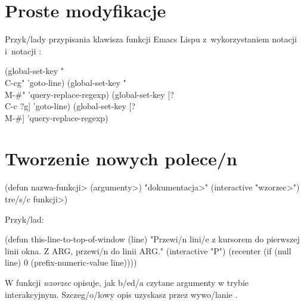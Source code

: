 \section{Proste modyfikacje}



Przyk/lady przypisania klawisza funkcji Emacs Lispu\newline
z~wykorzystaniem notacji  i~notacji \kbd{[...]}:

\beginexample%
(global-set-key "\\C-cg" 'goto-line)
(global-set-key "\\M-\#" 'query-replace-regexp)
\smallskip
(global-set-key [?\\C-c ?g] 'goto-line)
(global-set-key [?\\M-\#] 'query-replace-regexp)
\endexample

\section{Tworzenie nowych polece/n}

\beginexample%
(defun \<nazwa-funkcji> (\<argumenty>)
  "\<dokumentacja>" 
  (interactive "\<wzorzec>")
  \<tre/s/c funkcji>)
\endexample

Przyk/lad:

\beginexample%
(defun this-line-to-top-of-window (line)
  "Przewi/n lini/e z kursorem do pierwszej linii okna.
Z ARG, przewi/n do linii ARG."
  (interactive "P")
  (recenter (if (null line)
                0
              (prefix-numeric-value line))))
\endexample

W funkcji  {\it wzorzec\/} opisuje, jak b/ed/a czytane
argumenty w trybie interakcyjnym. Szczeg/o/lowy opis uzyskasz
przez wywo/lanie .

\copyrightnotice

\bye
